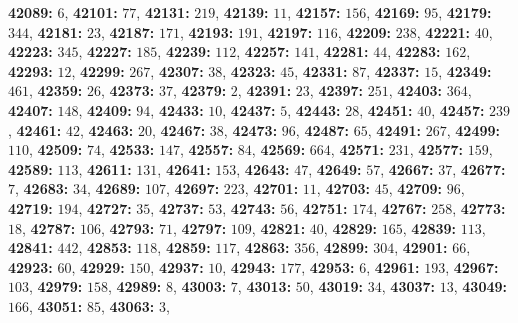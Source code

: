 \textsf{\bfseries 42089:} $6$, \textsf{\bfseries 42101:} $77$, \textsf{\bfseries 42131:} $219$, \textsf{\bfseries 42139:} $11$, \textsf{\bfseries 42157:} $156$, \textsf{\bfseries 42169:} $95$, \textsf{\bfseries 42179:} $344$, \textsf{\bfseries 42181:} $23$, \textsf{\bfseries 42187:} $171$, \textsf{\bfseries 42193:} $191$, \textsf{\bfseries 42197:} $116$, \textsf{\bfseries 42209:} $238$, \textsf{\bfseries 42221:} $40$, \textsf{\bfseries 42223:} $345$, \textsf{\bfseries 42227:} $185$, \textsf{\bfseries 42239:} $112$, \textsf{\bfseries 42257:} $141$, \textsf{\bfseries 42281:} $44$, \textsf{\bfseries 42283:} $162$, \textsf{\bfseries 42293:} $12$, \textsf{\bfseries 42299:} $267$, \textsf{\bfseries 42307:} $38$, \textsf{\bfseries 42323:} $45$, \textsf{\bfseries 42331:} $87$, \textsf{\bfseries 42337:} $15$, \textsf{\bfseries 42349:} $461$, \textsf{\bfseries 42359:} $26$, \textsf{\bfseries 42373:} $37$, \textsf{\bfseries 42379:} $2$, \textsf{\bfseries 42391:} $23$, \textsf{\bfseries 42397:} $251$, \textsf{\bfseries 42403:} $364$, \textsf{\bfseries 42407:} $148$, \textsf{\bfseries 42409:} $94$, \textsf{\bfseries 42433:} $10$, \textsf{\bfseries 42437:} $5$, \textsf{\bfseries 42443:} $28$, \textsf{\bfseries 42451:} $40$, \textsf{\bfseries 42457:} $239$, \textsf{\bfseries 42461:} $42$, \textsf{\bfseries 42463:} $20$, \textsf{\bfseries 42467:} $38$, \textsf{\bfseries 42473:} $96$, \textsf{\bfseries 42487:} $65$, \textsf{\bfseries 42491:} $267$, \textsf{\bfseries 42499:} $110$, \textsf{\bfseries 42509:} $74$, \textsf{\bfseries 42533:} $147$, \textsf{\bfseries 42557:} $84$, \textsf{\bfseries 42569:} $664$, \textsf{\bfseries 42571:} $231$, \textsf{\bfseries 42577:} $159$, \textsf{\bfseries 42589:} $113$, \textsf{\bfseries 42611:} $131$, \textsf{\bfseries 42641:} $153$, \textsf{\bfseries 42643:} $47$, \textsf{\bfseries 42649:} $57$, \textsf{\bfseries 42667:} $37$, \textsf{\bfseries 42677:} $7$, \textsf{\bfseries 42683:} $34$, \textsf{\bfseries 42689:} $107$, \textsf{\bfseries 42697:} $223$, \textsf{\bfseries 42701:} $11$, \textsf{\bfseries 42703:} $45$, \textsf{\bfseries 42709:} $96$, \textsf{\bfseries 42719:} $194$, \textsf{\bfseries 42727:} $35$, \textsf{\bfseries 42737:} $53$, \textsf{\bfseries 42743:} $56$, \textsf{\bfseries 42751:} $174$, \textsf{\bfseries 42767:} $258$, \textsf{\bfseries 42773:} $18$, \textsf{\bfseries 42787:} $106$, \textsf{\bfseries 42793:} $71$, \textsf{\bfseries 42797:} $109$, \textsf{\bfseries 42821:} $40$, \textsf{\bfseries 42829:} $165$, \textsf{\bfseries 42839:} $113$, \textsf{\bfseries 42841:} $442$, \textsf{\bfseries 42853:} $118$, \textsf{\bfseries 42859:} $117$, \textsf{\bfseries 42863:} $356$, \textsf{\bfseries 42899:} $304$, \textsf{\bfseries 42901:} $66$, \textsf{\bfseries 42923:} $60$, \textsf{\bfseries 42929:} $150$, \textsf{\bfseries 42937:} $10$, \textsf{\bfseries 42943:} $177$, \textsf{\bfseries 42953:} $6$, \textsf{\bfseries 42961:} $193$, \textsf{\bfseries 42967:} $103$, \textsf{\bfseries 42979:} $158$, \textsf{\bfseries 42989:} $8$, \textsf{\bfseries 43003:} $7$, \textsf{\bfseries 43013:} $50$, \textsf{\bfseries 43019:} $34$, \textsf{\bfseries 43037:} $13$, \textsf{\bfseries 43049:} $166$, \textsf{\bfseries 43051:} $85$, \textsf{\bfseries 43063:} $3$, 
